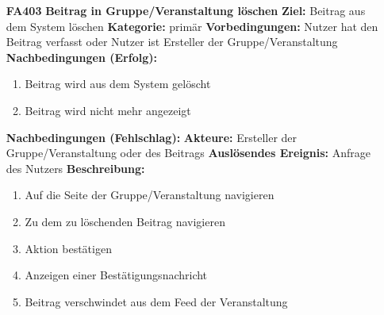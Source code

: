 \documentclass[parskip=full]{scrartcl}
\begin{document}
\begin{itemize}[nosep]
			\item[\textbf{FA403}]\textbf{Beitrag in Gruppe/Veranstaltung löschen}
			\newline \textbf{Ziel:} Beitrag aus dem System löschen
			\newline \textbf{Kategorie:} primär
			\newline \textbf{Vorbedingungen:} Nutzer hat den Beitrag verfasst oder Nutzer ist Ersteller der Gruppe/Veranstaltung
			\newline \textbf{Nachbedingungen (Erfolg):}
			\begin{enumerate}[nosep]
				\item Beitrag wird aus dem System gelöscht
				\item Beitrag wird nicht mehr angezeigt
			\end{enumerate}
			\textbf{Nachbedingungen (Fehlschlag):}
			\newline \textbf{Akteure:} Ersteller der Gruppe/Veranstaltung oder des Beitrags
			\newline \textbf{Auslösendes Ereignis:} Anfrage des Nutzers
			\newline \textbf{Beschreibung:}
			\begin{enumerate}[nosep]
				\item Auf die Seite der Gruppe/Veranstaltung navigieren
				\item Zu dem zu löschenden Beitrag navigieren
				\item Aktion bestätigen
				\item Anzeigen einer Bestätigungsnachricht
				\item Beitrag verschwindet aus dem \gls{Feed} der Veranstaltung\\
			\end{enumerate}
			

\end{itemize}
\end{document}
